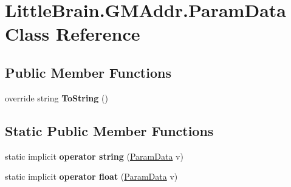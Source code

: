 \hypertarget{class_little_brain_1_1_g_m_addr_1_1_param_data}{}\section{Little\+Brain.\+G\+M\+Addr.\+Param\+Data Class Reference}
\label{class_little_brain_1_1_g_m_addr_1_1_param_data}
\subsection*{Public Member Functions}
\begin{DoxyCompactItemize}
\item 
override string {\bfseries To\+String} ()\hypertarget{class_little_brain_1_1_g_m_addr_1_1_param_data_a2432acdd7212cadb237f77aa7210a184}{}\label{class_little_brain_1_1_g_m_addr_1_1_param_data_a2432acdd7212cadb237f77aa7210a184}

\end{DoxyCompactItemize}
\subsection*{Static Public Member Functions}
\begin{DoxyCompactItemize}
\item 
static implicit {\bfseries operator string} (\hyperlink{class_little_brain_1_1_g_m_addr_1_1_param_data}{Param\+Data} v)\hypertarget{class_little_brain_1_1_g_m_addr_1_1_param_data_a40d8572e3cc3d736ac922a370c9d7138}{}\label{class_little_brain_1_1_g_m_addr_1_1_param_data_a40d8572e3cc3d736ac922a370c9d7138}

\item 
static implicit {\bfseries operator float} (\hyperlink{class_little_brain_1_1_g_m_addr_1_1_param_data}{Param\+Data} v)\hypertarget{class_little_brain_1_1_g_m_addr_1_1_param_data_a1e9a80960c95536ca39b983299ce5706}{}\label{class_little_brain_1_1_g_m_addr_1_1_param_data_a1e9a80960c95536ca39b983299ce5706}

\end{DoxyCompactItemize}
